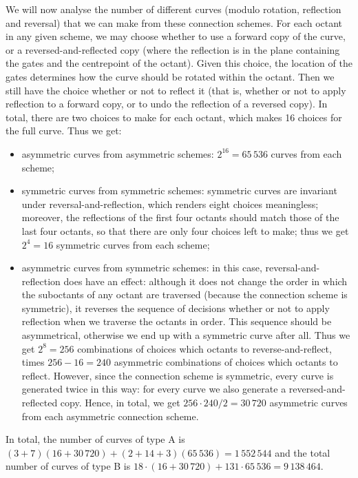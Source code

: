 \documentclass[11pt,a4paper]{article}
\begin{document}
We will now analyse the number of different curves (modulo rotation, reflection and reversal) that we can make from these connection schemes. For each octant in any given scheme, we may choose whether to use a forward copy of the curve, or a reversed-and-reflected copy (where the reflection is in the plane containing the gates and the centrepoint of the octant). Given this choice, the location of the gates determines how the curve should be rotated within the octant. Then we still have the choice whether or not to reflect it (that is, whether or not to apply reflection to a forward copy, or to undo the reflection of a reversed copy). In total, there are two choices to make for each octant, which makes 16 choices for the full curve. Thus we get:\begin{itemize}
\item asymmetric curves from asymmetric schemes: $2^{16} = 65\,536$ curves from each scheme;
\item symmetric curves from symmetric schemes: symmetric curves are invariant under reversal-and-reflection, which renders eight choices meaningless; moreover, the reflections of the first four octants should match those of the last four octants, so that there are only four choices left to make; thus we get $2^4 = 16$ symmetric curves from each scheme;
\item asymmetric curves from symmetric schemes: in this case, reversal-and-reflection does have an effect: although it does not change the order in which the suboctants of any octant are traversed (because the connection scheme is symmetric), it reverses the sequence of decisions whether or not to apply reflection when we traverse the octants in order. This sequence should be asymmetrical, otherwise we end up with a symmetric curve after all. Thus we get $2^8 = 256$ combinations of choices which octants to reverse-and-reflect, times $256-16 = 240$ asymmetric combinations of choices which octants to reflect. However, since the connection scheme is symmetric, every curve is generated twice in this way: for every curve we also generate a reversed-and-reflected copy. Hence, in total, we get $256 \cdot 240 / 2 = 30\,720$ asymmetric curves from each asymmetric connection scheme.
\end{itemize}
\label{sec:OmHnumbering}
In total, the number of curves of type A is $(3 + 7) (16 + 30\,720) + (2 + 14 + 3)(65\,536) = 1\,552\,544$ and the total number of curves of type B is $18 \cdot (16 + 30\,720) + 131 \cdot 65\,536 = 9\,138\,464$.
\end{document}
